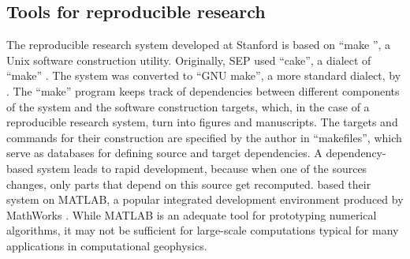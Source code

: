 

\subsection{Tools for reproducible research}

The reproducible research system developed at Stanford is based on
``make \cite[]{make}'', a Unix software construction utility.
Originally, SEP used ``cake'', a dialect of ``make''
\cite[]{Nichols.sep.61.341,Claerbout.sep.67.145,Claerbout.sep.73.451,Claerbout.sep.77.427}.
The system was converted to ``GNU make'', a more standard dialect, by
\cite{Schwab.sep.89.217}.  The ``make'' program keeps track of
dependencies between different components of the system and the
software construction targets, which, in the case of a reproducible
research system, turn into figures and manuscripts. The targets and
commands for their construction are specified by the author in
``makefiles'', which serve as databases for defining source and target
dependencies. A dependency-based system leads to rapid development,
because when one of the sources changes, only parts that depend on
this source get recomputed.  \cite{donoho} based their system on
MATLAB, a popular integrated development environment produced by
MathWorks \cite[]{matlab}.  While MATLAB is an adequate tool for
prototyping numerical algorithms, it may not be sufficient for
large-scale computations typical for many applications in
computational geophysics.

